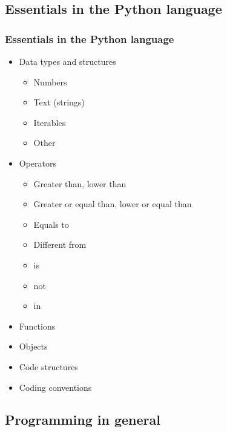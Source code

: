 \subsection{Essentials in the Python language}

\begin{frame}\frametitle{Essentials in the Python language}

   \begin{itemize}
      \item Data types and structures
      \begin{itemize}
         \item Numbers
         \item Text (strings)
         \item Iterables
         \item Other
      \end{itemize}

      \item Operators
      \begin{itemize}
         \item Greater than, lower than
         \item Greater or equal than, lower or equal than
         \item Equals to
         \item Different from
         \item is
         \item not
         \item in
      \end{itemize}

      \item Functions

      \item Objects

      \item Code structures
      \item Coding conventions
   \end{itemize}

\end{frame}

\subsection{Programming in general}

